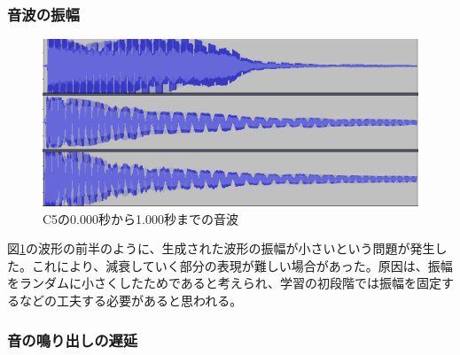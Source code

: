 \subsubsection{音波の振幅}

\begin{figure}[t]
\begin{center}
\includegraphics[width=0.7\hsize]{figure/88_88/c5.png}
\caption{C5の0.000秒から1.000秒までの音波}
\label{fig:88_88_amp}
\end{center}
\end{figure}

図\ref{fig:88_88_amp}の波形の前半のように、生成された波形の振幅が小さいという問題が発生した。これにより、減衰していく部分の表現が難しい場合があった。原因は、振幅をランダムに小さくしたためであると考えられ、学習の初段階では振幅を固定するなどの工夫する必要があると思われる。
    
\subsubsection{音の鳴り出しの遅延}


